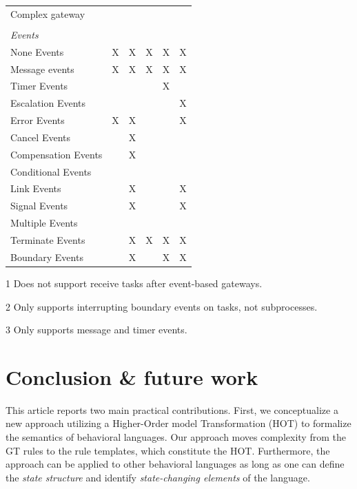 \documentclass{lmcs} %
\begin{document}
\begin{table}[htbp]
\begin{threeparttable}
\begin{tabular}{l l l l l l}
      Complex gateway & & & & &\\
      \\
      \textit{Events} \\
      None Events & X & X & X & X & X\\
      Message events & X & X & X & X & X\\
      Timer Events & & & & X & \\
      Escalation Events & & & & & X\\
      Error Events & X & X & & & X\\
      Cancel Events & & X & & &\\
      Compensation Events & & X & & &\\
      Conditional Events & & & & &\\
      Link Events & & X & & & X\\
      Signal Events & & X & & & X\\
      Multiple Events & &  & & & \\
      Terminate Events & & X & X & X & X\\
      Boundary Events & & X\tnote{2} & & X\tnote{3} & X\\ %
    \end{tabular}
    \begin{tablenotes}
        \item[1] Does not support receive tasks after event-based gateways.
        \item[2] Only supports interrupting boundary events on tasks, not subprocesses.
        \item[3] Only supports message and timer events.
    \end{tablenotes}
    \end{threeparttable}
\end{table}


\section{Conclusion \& future work} \label{sec:conclusion}
This article reports two main practical contributions.
First, we conceptualize a new approach utilizing a Higher-Order model Transformation (HOT) to formalize the semantics of behavioral languages.
Our approach moves complexity from the GT rules to the rule templates, which constitute the HOT.
Furthermore, the approach can be applied to other behavioral languages as long as one can define the \textit{state structure} and identify \textit{state-changing elements} of the language.
\end{document}
